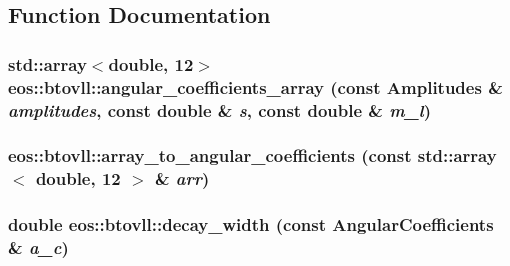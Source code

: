 \subsection{Function Documentation}
\hypertarget{namespaceeos_1_1btovll_ab3d297e4fc263252e595a1447427afd9}{
\subsubsection[{angular\_\-coefficients\_\-array}]{\setlength{\rightskip}{0pt plus 5cm}std::array$<$double, 12$>$ eos::btovll::angular\_\-coefficients\_\-array (const Amplitudes \& {\em amplitudes}, \/  const double \& {\em s}, \/  const double \& {\em m\_\-l})}}
\label{namespaceeos_1_1btovll_ab3d297e4fc263252e595a1447427afd9}
\hypertarget{namespaceeos_1_1btovll_af4a61503514b02cdc2239f33915ac237}{
\subsubsection[{array\_\-to\_\-angular\_\-coefficients}]{ eos::btovll::array\_\-to\_\-angular\_\-coefficients (const std::array$<$ double, 12 $>$ \& {\em arr})}}
\label{namespaceeos_1_1btovll_af4a61503514b02cdc2239f33915ac237}
\hypertarget{namespaceeos_1_1btovll_a7cdeae9d6d5f6d7b7df686f4ec9358c0}{
\subsubsection[{decay\_\-width}]{\setlength{\rightskip}{0pt plus 5cm}double eos::btovll::decay\_\-width (const AngularCoefficients \& {\em a\_\-c})}}
\label{namespaceeos_1_1btovll_a7cdeae9d6d5f6d7b7df686f4ec9358c0}
